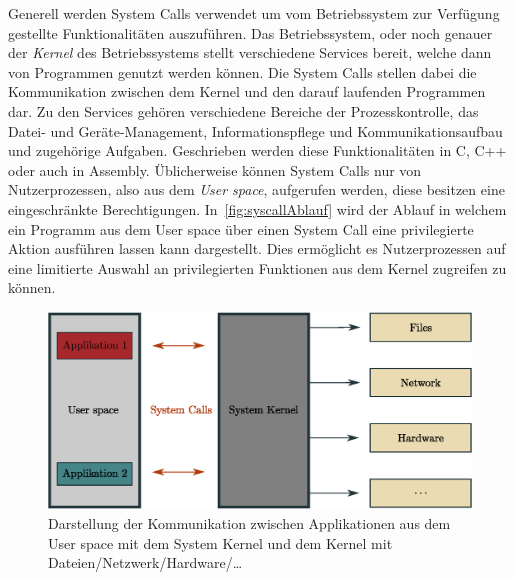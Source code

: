         Generell werden System Calls verwendet um vom Betriebssystem zur Verfügung gestellte Funktionalitäten auszuführen.
        Das Betriebssystem, oder noch genauer der \textit{Kernel}  des Betriebssystems stellt verschiedene Services bereit, welche dann von Programmen genutzt werden können. 
        Die System Calls stellen dabei die Kommunikation zwischen dem Kernel und den darauf laufenden Programmen dar.
        Zu den Services gehören verschiedene Bereiche der Prozesskontrolle, das Datei- und Geräte-Management, Informationspflege und Kommunikationsaufbau und zugehörige Aufgaben.
        Geschrieben werden diese Funktionalitäten in C, C++ oder auch in Assembly.
        Üblicherweise können System Calls nur von Nutzerprozessen, also aus dem \textit{User space}, aufgerufen werden, diese besitzen eine eingeschränkte Berechtigungen.
        In~\autoref{fig:syscallAblauf} wird der Ablauf in welchem ein Programm aus dem User space über einen System Call eine privilegierte Aktion ausführen lassen kann dargestellt.
        Dies ermöglicht es Nutzerprozessen auf eine limitierte Auswahl an privilegierten Funktionen aus dem Kernel zugreifen zu können.~\cite{SYSCALL_SILBERSCHATZ}
    
        \begin{figure}[ht]
            \centering
            \includegraphics[width=1\textwidth]{images/Illustrationen/IDS/syscalls}
            \caption{Darstellung der Kommunikation zwischen Applikationen aus dem User space mit dem System Kernel und dem Kernel mit Dateien/Netzwerk/Hardware/\dots}
            \label{fig:syscallAblauf}
        \end{figure}

